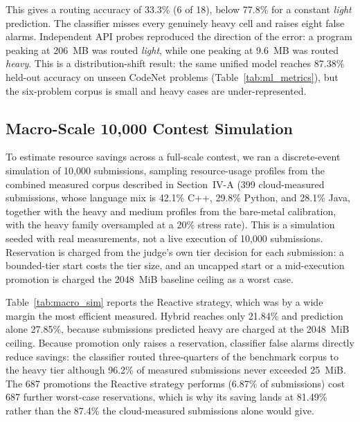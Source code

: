 \documentclass[conference]{IEEEtran}
\begin{document}
This gives a routing accuracy of 33.3\% (6 of 18), below 77.8\% for a constant \emph{light} prediction. The classifier misses every genuinely heavy cell and raises eight false alarms. Independent API probes reproduced the direction of the error: a program peaking at 206~MB was routed \emph{light}, while one peaking at 9.6~MB was routed \emph{heavy}. This is a distribution-shift result: the same unified model reaches 87.38\% held-out accuracy on unseen CodeNet problems (Table~\ref{tab:ml_metrics}), but the six-problem corpus is small and heavy cases are under-represented.

\subsection{Macro-Scale 10,000 Contest Simulation}
To estimate resource savings across a full-scale contest, we ran a discrete-event simulation of 10,000 submissions, sampling resource-usage profiles from the combined measured corpus described in Section~IV-A (399 cloud-measured submissions, whose language mix is 42.1\% C++, 29.8\% Python, and 28.1\% Java, together with the heavy and medium profiles from the bare-metal calibration, with the heavy family oversampled at a 20\% stress rate). This is a simulation seeded with real measurements, not a live execution of 10,000 submissions. Reservation is charged from the judge's own tier decision for each submission: a bounded-tier start costs the tier size, and an uncapped start or a mid-execution promotion is charged the 2048~MiB baseline ceiling as a worst case.

Table~\ref{tab:macro_sim} reports the Reactive strategy, which was by a wide margin the most efficient measured. Hybrid reaches only 21.84\% and prediction alone 27.85\%, because submissions predicted heavy are charged at the 2048~MiB ceiling. Because promotion only raises a reservation, classifier false alarms directly reduce savings: the classifier routed three-quarters of the benchmark corpus to the heavy tier although 96.2\% of measured submissions never exceeded 25~MiB. The 687 promotions the Reactive strategy performs (6.87\% of submissions) cost 687 further worst-case reservations, which is why its saving lands at 81.49\% rather than the 87.4\% the cloud-measured submissions alone would give.
\end{document}
